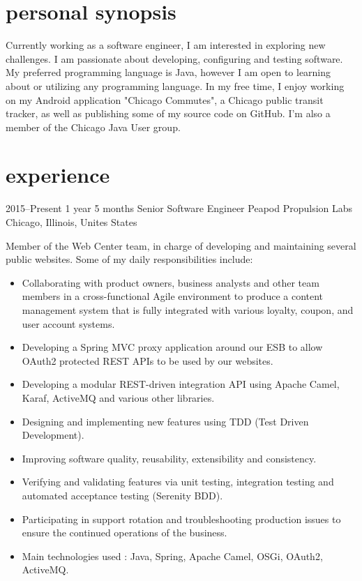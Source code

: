\documentclass[]{friggeri-cv} %
\begin{document}
\section{personal synopsis}

Currently working as a software engineer, I am interested in exploring new challenges. I am passionate about developing, configuring and testing software. My preferred programming language is Java, however I am open to learning about or utilizing any programming language. In my free time, I enjoy working on my Android application "Chicago Commutes", a Chicago public transit tracker, as well as publishing some of my source code on GitHub. I'm also a member of the Chicago Java User group.



\section{experience}


\begin{entrylist}

\entry
{2015--Present}
{1 year 5 months}
{Senior Software Engineer} 
{Peapod Propulsion Labs}
{Chicago, Illinois, Unites States}
{Member of the Web Center team, in charge of developing and maintaining several public websites. Some of my daily responsibilities include:\\
\vspace{-4mm}
\begin{itemize}
	\item Collaborating with product owners, business analysts and other team members in a cross-functional Agile environment to produce a content management system that is fully integrated with various loyalty, coupon, and user account systems.
		\item Developing a Spring MVC proxy application around our ESB to allow OAuth2 protected REST APIs to be used by our websites.
	\item Developing a modular REST-driven integration API using Apache Camel, Karaf, ActiveMQ and various other libraries.
	\item Designing and implementing new features using TDD (Test Driven Development).
	\item Improving software quality, reusability, extensibility and consistency.
	\item Verifying and validating features via unit testing, integration testing and automated acceptance testing (Serenity BDD).
	\item Participating in support rotation and troubleshooting production issues to ensure the continued operations of the business.
	\item Main technologies used : Java, Spring, Apache Camel, OSGi, OAuth2, ActiveMQ.
\end{itemize}
}
\vspace{-7mm}

\end{entrylist}
\end{document}
